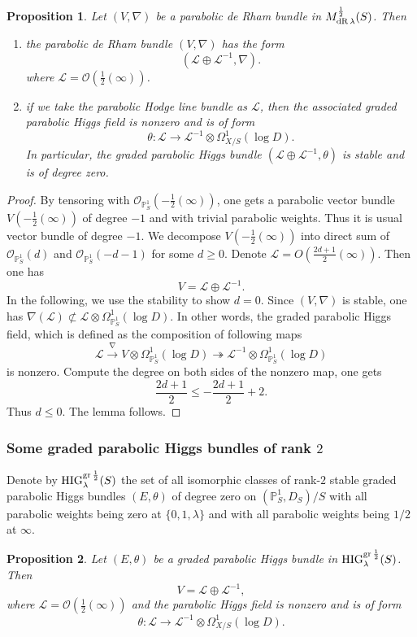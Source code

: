\documentclass[12pt,twoside]{book}
\theoremstyle{plain}
\newtheorem{proposition}[proposition]{Proposition}
\theoremstyle{definition}
\theoremstyle{remark}
\newcommand{\bP}{{\mathbb P}}
\newcommand{\mL}{{\mathcal L}}
\newcommand{\mO}{{\mathcal O}}
\numberwithin{equation}{section}
\def\High{{\mathrm{HIG}^{{\rm gr}\,{1\over 2}}_{\lambda}}}
\def\MdRh{{M^{{1\over 2}}_{{\rm dR}\,\lambda}}}
\begin{document}
\begin{proposition} \label{thm_ClassfyR2PdE} Let $(V,\nabla)$ be a parabolic de Rham bundle in $\MdRh(S)$. Then
\begin{enumerate}
\item[$(1)$]
the parabolic de Rham bundle $(V,\nabla)$ has the form
\[(\mL\oplus \mL^{-1},\nabla).\]
where $\mL=\mO(\frac12(\infty))$.
\item[$(2)$]
if we take the \emph{parabolic Hodge line bundle} as $\mL$, then the associated graded parabolic Higgs field is nonzero and is of form
\[\theta\colon \mL\rightarrow \mL^{-1}\otimes \Omega^1_{X/S}(\log D).\]
In particular, the graded parabolic Higgs bundle $(\mL\oplus \mL^{-1},\theta)$ is stable and is of degree zero.
\end{enumerate}
\end{proposition}

\begin{proof}
By tensoring with $\mO_{\bP^1_S}(-\frac12(\infty))$, one gets a parabolic vector bundle $V(-\frac12(\infty))$ of degree $-1$ and with trivial parabolic weights. Thus it is usual vector bundle of degree $-1$. We decompose $V(-\frac12(\infty))$ into direct sum of $\mO_{\bP^1_S}(d)$ and $\mO_{\bP^1_S}(-d-1)$ for some $d\geq0$. Denote $\mL=O(\frac{2d+1}2(\infty))$. Then one has
\[V = \mL\oplus \mL^{-1}.\]
In the following, we use the stability to show $d=0$. Since $(V,\nabla)$ is stable, one has $\nabla(\mL)\not\subset \mL\otimes \Omega^1_{\bP^1_S}(\log D)$. In other words, the graded parabolic Higgs field, which is defined as the composition of following maps
\[\mL \xrightarrow{\nabla} V\otimes\Omega^1_{\bP^1_S}(\log D) \twoheadrightarrow \mL^{-1}\otimes\Omega^1_{\bP^1_S}(\log D)\]
is nonzero. Compute the degree on both sides of the nonzero map, one gets
\[\frac{2d+1}2 \leq -\frac{2d+1}2 + 2.\]
Thus $d\leq 0$. The lemma follows.
\end{proof}


\subsubsection{Some graded parabolic Higgs bundles of rank $2$}

Denote by \emph{$\High(S)$} the set of all isomorphic classes of rank-$2$ stable graded parabolic Higgs bundles $(E,\theta)$ of degree zero on $(\bP^1_S,D_S)/S$ with all parabolic weights being zero at $\{0,1,\lambda\}$ and with all parabolic weights being $1/2$ at $\infty$.

\begin{proposition}\label{thm_ClassfyR2PHiggs} Let $(E,\theta)$ be a graded parabolic Higgs bundle in $\High(S)$. Then
\[V = \mL\oplus \mL^{-1},\]
where $\mL=\mO(\frac12(\infty))$ and the parabolic Higgs field is nonzero and is of form
\[\theta\colon \mL\rightarrow \mL^{-1}\otimes \Omega^1_{X/S}(\log D).\]
\end{proposition}
\end{document}
